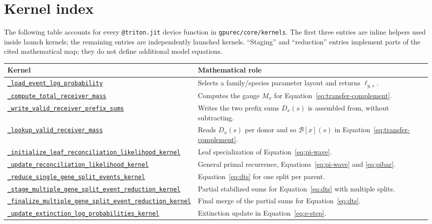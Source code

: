 \documentclass[11pt]{article}
\newcommand{\kernelref}[2]{\href{../../gpurec/core/kernels/#1}{\nolinkurl{#2}}}
\begin{document}
\section{Kernel index}
\label{sec:kernel-index}

The following table accounts for every \texttt{@triton.jit} device function in
\texttt{gpurec/core/kernels}.  The first three entries are inline helpers used
inside launch kernels; the remaining entries are independently launched
kernels.  ``Staging'' and ``reduction'' entries implement parts of the cited
mathematical map; they do not define additional model equations.

\small
\begin{longtable}{>{\raggedright\arraybackslash}p{}
                  >{\raggedright\arraybackslash}p{}}
\toprule
Kernel & Mathematical role \\
\midrule
\endhead
\kernelref{pi_forward.py}{_load_event_log_probability} & Selects a family/species parameter layout and returns $\ell_{g,s}$. \\
\kernelref{pi_forward.py}{_compute_total_receiver_mass} & Computes the gauge $M_x$ for Equation~\eqref{eq:transfer-complement}. \\
\kernelref{pi_forward.py}{_write_valid_receiver_prefix_sums} & Writes the two prefix sums $D_x(s)$ is assembled from, without subtracting. \\
\kernelref{pi_forward.py}{_lookup_valid_receiver_mass} & Reads $D_x(s)$ per donor and so $\mathcal B[x](s)$ in Equation~\eqref{eq:transfer-complement}. \\
\kernelref{pi_forward.py}{_initialize_leaf_reconciliation_likelihood_kernel} & Leaf specialization of Equation~\eqref{eq:pi-wave}. \\
\kernelref{pi_forward.py}{_update_reconciliation_likelihood_kernel} & General primal recurrence, Equations~\eqref{eq:pi-wave} and \eqref{eq:pibar}. \\
\kernelref{pi_forward.py}{_reduce_single_gene_split_events_kernel} & Equation~\eqref{eq:dts} for one split per parent. \\
\kernelref{pi_forward.py}{_stage_multiple_gene_split_event_reduction_kernel} & Partial stabilized sums for Equation~\eqref{eq:dts} with multiple splits. \\
\kernelref{pi_forward.py}{_finalize_multiple_gene_split_event_reduction_kernel} & Final merge of the partial sums for Equation~\eqref{eq:dts}. \\
\kernelref{e_step.py}{_update_extinction_log_probabilities_kernel} & Extinction update in Equation~\eqref{eq:e-step}. \\

\end{longtable}
\end{document}
